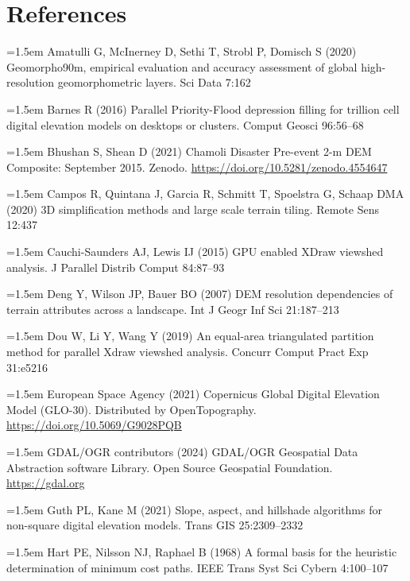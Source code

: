 \documentclass[10pt,a4paper]{article}
\begin{document}
\section*{\centering References}
\begingroup\setlength{\parskip}{3pt}\singlespacing
\noindent\hangindent=1.5em Amatulli G, McInerney D, Sethi T, Strobl P, Domisch S (2020) Geomorpho90m, empirical evaluation and accuracy assessment of global high-resolution geomorphometric layers. Sci Data 7:162\par
\noindent\hangindent=1.5em Barnes R (2016) Parallel Priority-Flood depression filling for trillion cell digital elevation models on desktops or clusters. Comput Geosci 96:56--68\par
\noindent\hangindent=1.5em Bhushan S, Shean D (2021) Chamoli Disaster Pre-event 2-m DEM Composite: September 2015. Zenodo. \url{https://doi.org/10.5281/zenodo.4554647}\par
\noindent\hangindent=1.5em Campos R, Quintana J, Garcia R, Schmitt T, Spoelstra G, Schaap DMA (2020) 3D simplification methods and large scale terrain tiling. Remote Sens 12:437\par
\noindent\hangindent=1.5em Cauchi-Saunders AJ, Lewis IJ (2015) GPU enabled XDraw viewshed analysis. J Parallel Distrib Comput 84:87--93\par
\noindent\hangindent=1.5em Deng Y, Wilson JP, Bauer BO (2007) DEM resolution dependencies of terrain attributes across a landscape. Int J Geogr Inf Sci 21:187--213\par
\noindent\hangindent=1.5em Dou W, Li Y, Wang Y (2019) An equal-area triangulated partition method for parallel Xdraw viewshed analysis. Concurr Comput Pract Exp 31:e5216\par
\noindent\hangindent=1.5em European Space Agency (2021) Copernicus Global Digital Elevation Model (GLO-30). Distributed by OpenTopography. \url{https://doi.org/10.5069/G9028PQB}\par
\noindent\hangindent=1.5em GDAL/OGR contributors (2024) GDAL/OGR Geospatial Data Abstraction software Library. Open Source Geospatial Foundation. \url{https://gdal.org}\par
\noindent\hangindent=1.5em Guth PL, Kane M (2021) Slope, aspect, and hillshade algorithms for non-square digital elevation models. Trans GIS 25:2309--2332\par
\noindent\hangindent=1.5em Hart PE, Nilsson NJ, Raphael B (1968) A formal basis for the heuristic determination of minimum cost paths. IEEE Trans Syst Sci Cybern 4:100--107\par
\end{document}
